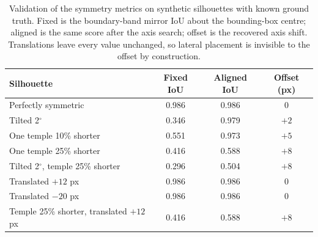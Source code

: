 \documentclass[electronics,article,submit,pdftex,moreauthors]{Definitions/mdpi}
\begin{document}
\begin{table}[H]
\caption{Validation of the symmetry metrics on synthetic silhouettes with
known ground truth. Fixed is the boundary-band mirror IoU about the
bounding-box centre; aligned is the same score after the axis search;
offset is the recovered axis shift. Translations leave every value
unchanged, so lateral placement is invisible to the offset by
construction.}
\label{tab:symval}
\begin{tabular}{lccc}
\toprule
\textbf{Silhouette} & \textbf{Fixed IoU} & \textbf{Aligned IoU} &
\textbf{Offset (px)} \\
\midrule
Perfectly symmetric                   & 0.986 & 0.986 & 0 \\
Tilted 2$^{\circ}$                    & 0.346 & 0.979 & $+2$ \\
One temple 10\% shorter               & 0.551 & 0.973 & $+5$ \\
One temple 25\% shorter               & 0.416 & 0.588 & $+8$ \\
Tilted 2$^{\circ}$, temple 25\% shorter & 0.296 & 0.504 & $+8$ \\
Translated $+12$ px                   & 0.986 & 0.986 & 0 \\
Translated $-20$ px                   & 0.986 & 0.986 & 0 \\
Temple 25\% shorter, translated $+12$ px & 0.416 & 0.588 & $+8$ \\
\bottomrule
\end{tabular}
\end{table}
\end{document}
